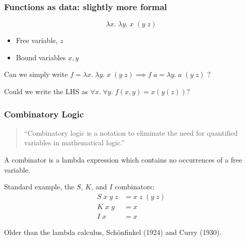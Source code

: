 \documentclass[aspectratio=1610, xcolor={dvipsnames}]{beamer}
\begin{document}
\begin{frame}
    \frametitle{Functions as data: slightly more formal}

    \begin{equation*}
        \lambda x.\; \lambda y.\; x \;(y \;z)
    \end{equation*}

    \begin{itemize}
        \item Free variable, \(z\)
        \item Bound variables \(x, y\)
    \end{itemize}

    Can we simply write \(f = \lambda x.\; \lambda y.\; x \;(y \;z) \implies f \;a =  \lambda y.\; a\; (y\; z)\) ?

    \pause

    Could we write the LHS as \(\forall x.\; \forall y.\; f(x, y) = x(y(z))\)?

\end{frame}

\begin{frame}
    \frametitle{Combinatory Logic}

    \begin{quote}
        ``Combinatory logic is a notation to eliminate the need for quantified variables in mathematical logic.''
    \end{quote}

    \pause

    \begin{definition}[Baren]
        A combinator is a lambda expression which contains no occurrences of a free variable.
    \end{definition}

    Standard example, the \(S\), \(K\), and \(I\) combinators:
    \begin{align*}
        S \;x \;y \;z &= x \;z \;(y \;z) \tag{Verschmelzungsfunktion}\\
        K \;x \;y &= x \tag{Konstanzfunktion}\\
        I \;x &= x \tag{Identit\"atsfunktion}
    \end{align*} 

    \pause
    Older than the lambda calculus, Sch\"onfinkel (1924) and Curry (1930).

\end{frame}
\end{document}
